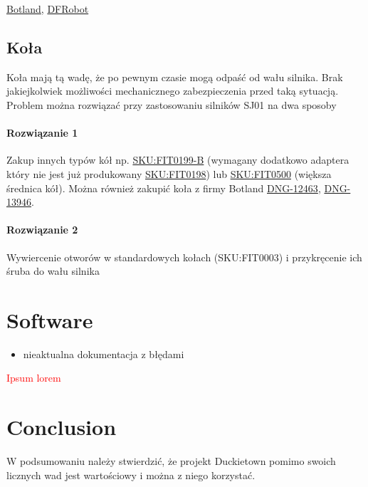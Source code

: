 \documentclass{svproc}
\begin{document}
\href{https://botland.com.pl/silniki-dc-z-przekladnia-i-enkoderami/6287-silnik-z-przekladnia-sj01-120-1-6v-160rpm-enkoder-5904422306793.html}{Botland}, \href{https://www.dfrobot.com/product-1457.html}{DFRobot}

\subsection{Koła}
Koła mają tą wadę, że po pewnym czasie mogą odpaść od wału silnika. Brak jakiejkolwiek możliwości mechanicznego zabezpieczenia przed taką sytuacją. Problem można rozwiązać przy zastosowaniu silników SJ01 na dwa sposoby
\paragraph{Rozwiązanie 1}
Zakup innych typów kół np. \href{https://www.dfrobot.com/product-652.html}{SKU:FIT0199-B} (wymagany dodatkowo  adaptera który nie jest już produkowany \href{https://www.dfrobot.com/product-645.html}{SKU:FIT0198}) lub \href{https://www.dfrobot.com/product-1535.html}{SKU:FIT0500} (większa średnica kół). Można również zakupić koła z firmy Botland \href{https://botland.com.pl/kola-z-oponami/12463-kolo-65x15-mm-biale-5903351248143.html}{DNG-12463}, \href{https://botland.com.pl/kola-z-oponami/13946-kolo-z-opona-65x13mm-biale-5903351248174.html}{DNG-13946}.

\paragraph{Rozwiązanie 2}
Wywiercenie otworów w standardowych kołach (SKU:FIT0003) i przykręcenie ich śruba do wału silnika

\section{Software}
\begin{itemize}
	\item nieaktualna dokumentacja z błędami
\end{itemize}

%
\textcolor{red}{
Ipsum lorem}

\section{Conclusion}
W podsumowaniu należy stwierdzić, że projekt Duckietown pomimo swoich licznych wad jest wartościowy i można z niego korzystać.



\end{document}
